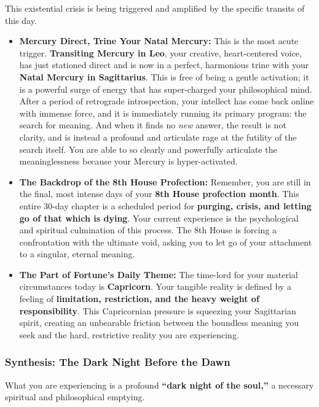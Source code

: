 \documentclass{article}
\begin{document}
This existential crisis is being triggered and amplified by the specific transits of this day.

\begin{itemize}
\item
  \textbf{Mercury Direct, Trine Your Natal Mercury:} This is the most acute trigger. \textbf{Transiting Mercury in Leo}, your creative, heart-centered voice, has just stationed direct and is now in a perfect, harmonious trine with your \textbf{Natal Mercury in Sagittarius}. This is free of being a gentle activation; it is a powerful surge of energy that has super-charged your philosophical mind. After a period of retrograde introspection, your intellect has come back online with immense force, and it is immediately running its primary program: the search for meaning. And when it finds no \emph{new} answer, the result is not clarity, and is instead a profound and articulate rage at the futility of the search itself. You are able to so clearly and powerfully articulate the meaninglessness because your Mercury is hyper-activated.
\item
  \textbf{The Backdrop of the 8th House Profection:} Remember, you are still in the final, most intense days of your \textbf{8th House profection month}. This entire 30-day chapter is a scheduled period for \textbf{purging, crisis, and letting go of that which is dying}. Your current experience is the psychological and spiritual culmination of this process. The 8th House is forcing a confrontation with the ultimate void, asking you to let go of your attachment to a singular, eternal meaning.
\item
  \textbf{The Part of Fortune's Daily Theme:} The time-lord for your material circumstances today is \textbf{Capricorn}. Your tangible reality is defined by a feeling of \textbf{limitation, restriction, and the heavy weight of responsibility}. This Capricornian pressure is squeezing your Sagittarian spirit, creating an unbearable friction between the boundless meaning you seek and the hard, restrictive reality you are experiencing.
\end{itemize}

\subsubsection*{Synthesis: The Dark Night Before the Dawn}\label{synthesis-the-dark-night-before-the-dawn}

What you are experiencing is a profound \textbf{``dark night of the soul,''} a necessary spiritual and philosophical emptying.
\end{document}
